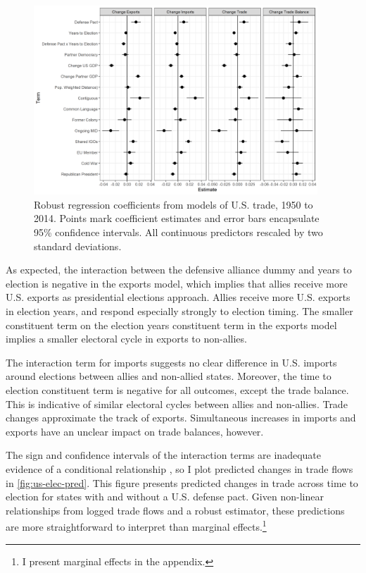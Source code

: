 \documentclass[12pt]{article}
\begin{document}
\begin{figure}
\centering
\includegraphics[width=0.95\textwidth]{../figures/us-trade-coefs.png}
\caption{Robust regression coefficients from models of U.S. trade, 1950 to 2014. Points mark coefficient estimates and error bars encapsulate 95\% confidence intervals. All continuous predictors rescaled by two standard deviations.}
\label{fig:us-trade-coefs}
\end{figure}


As expected, the interaction between the defensive alliance dummy and years to election is negative in the exports model, which implies that allies receive more U.S. exports as presidential elections approach.
Allies receive more U.S. exports in election years, and respond especially strongly to election timing.
The smaller constituent term on the election years constituent term in the exports model implies a smaller electoral cycle in exports to non-allies.


The interaction term for imports suggests no clear difference in U.S. imports around elections between allies and non-allied states. 
Moreover, the time to election constituent term is negative for all outcomes, except the trade balance. 
This is indicative of similar electoral cycles between allies and non-allies.
Trade changes approximate the track of exports. 
Simultaneous increases in imports and exports have an unclear impact on trade balances, however. 
 


The sign and confidence intervals of the interaction terms are inadequate evidence of a conditional relationship \citep{BramborClarkGolder2006}, so I plot predicted changes in trade flows in \autoref{fig:us-elec-pred}.
This figure presents predicted changes in trade across time to election for states with and without a U.S. defense pact. 
Given non-linear relationships from logged trade flows and a robust estimator, these predictions are more straightforward to interpret than marginal effects.\footnote{I present marginal effects in the appendix.} 
\end{document}
